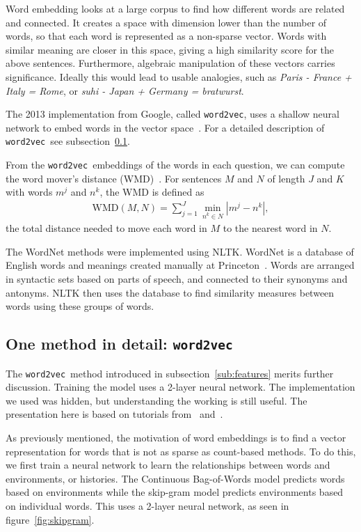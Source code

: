 \documentclass{article} %
\newcommand{\wordtvec}{\texttt{word2vec}}
\begin{document}
	Word embedding looks at a large corpus to find how different words are related and connected. It creates a space with dimension lower than the number of words, so that each word is represented as a non-sparse vector. Words with similar meaning are closer in this space, giving a high similarity score for the above sentences. Furthermore, algebraic manipulation of these vectors carries significance. Ideally this would lead to usable analogies, such as \textit{Paris - France + Italy = Rome}, or \textit{suhi - Japan + Germany = bratwurst}.
	
	The 2013 implementation from Google, called \wordtvec, uses a shallow neural network to embed words in the vector space~\cite{word2vec}. For a detailed description of \wordtvec\ see subsection~\ref{sub:detail}.
	
	From the \wordtvec\ embeddings of the words in each question, we can compute the word mover's distance (WMD)~\cite{kusner15}. For sentences $M$ and $N$ of length $J$ and $K$ with words $m^j$ and $n^k$, the WMD is defined as 
	\begin{align}
	\text{WMD}(M,N) = \sum_{j=1}^J\min_{n^k\in N}\left|m^j-n^k\right|,
	\end{align}
	the total distance needed to move each word in $M$ to the nearest word in $N$.
	
	The WordNet methods were implemented using NLTK. WordNet is a database of English words and meanings created manually at Princeton~\cite{wordnet}. Words are arranged in syntactic sets based on parts of speech, and connected to their synonyms and antonyms. NLTK then uses the database to find similarity measures between words using these groups of words. 
	
	\subsection{One method in detail: \wordtvec} \label{sub:detail}
	
	The \wordtvec\ method introduced in subsection~\ref{sub:features} merits further discussion. Training the model uses a 2-layer neural network. The implementation we used was hidden, but understanding the working is still useful. The presentation here is based on tutorials from~\cite{tensorflow} and~\cite{mccormick}.
	
	As previously mentioned, the motivation of word embeddings is to find a vector representation for words that is not as sparse as count-based methods. To do this, we first train a neural network to learn the relationships between words and environments, or histories. The Continuous Bag-of-Words model predicts words based on environments while the skip-gram model predicts environments based on individual words. This uses a 2-layer neural network, as seen in figure~\ref{fig:skipgram}. 
	
\end{document}
